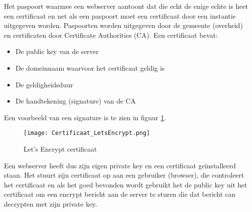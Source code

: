 Het paspoort waarmee een webserver aantoont dat die echt de enige echte is heet een certificaat en net als een paspoort moet een certificaat door een instantie uitgegeven worden. Paspoorten worden uitgegeven door de gemeente (overheid) en certificaten door Certificate Authorities (CA). Een certificaat bevat:
\begin{itemize}
\item De public key van de server
\item De domeinnaam waarvoor het certificaat geldig is
\item De geldigheidsduur
\item De handtekening (signature) van de CA
\end{itemize}

Een voorbeeld van een signature is te zien in figuur \ref{img:cert:letsencrypt}.

\begin{figure}[h]
\centering
\texttt{[image: Certificaat\_LetsEncrypt.png]}
\caption{Let's Encrypt certificaat}
\label{img:cert:letsencrypt}
\end{figure}

Een webserver heeft dus zijn eigen private key en een certificaat ge\"installeerd staan. Het stuurt zijn certificaat op aan een gebruiker (browser), die controleert het certificaat en als het goed bevonden wordt gebruikt het de public key uit het certificaat om een encrypt bericht aan de server te sturen die dat bericht can decrypten met zijn private key.
